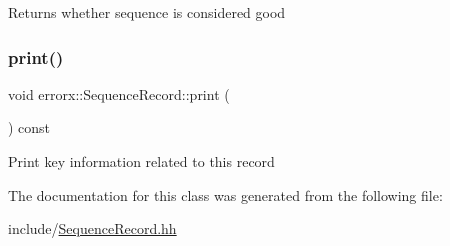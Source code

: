 \begin{DoxyReturn}{Returns}
whether sequence is considered good 
\end{DoxyReturn}
\mbox{\label{classerrorx_1_1_sequence_record_ab6ef0d5067f8c28aee8fb826b7a5922e}} 
\subsubsection{\texorpdfstring{print()}{print()}}
{\footnotesize\ttfamily void errorx\+::\+Sequence\+Record\+::print (\begin{DoxyParamCaption}{ }\end{DoxyParamCaption}) const}

Print key information related to this record 

The documentation for this class was generated from the following file\+:\begin{DoxyCompactItemize}
\item 
include/\mbox{\hyperlink{_sequence_record_8hh}{Sequence\+Record.\+hh}}\end{DoxyCompactItemize}
